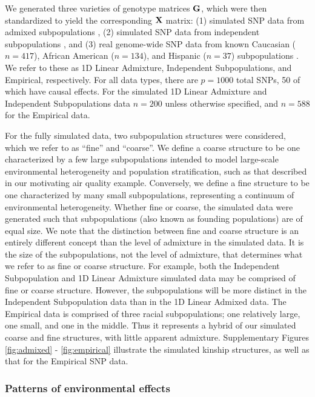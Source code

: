 We generated three varieties of genotype matrices $\mathbf{G}$, which were then standardized to yield the corresponding $\mathbf{X}$ matrix: (1) simulated SNP data from admixed subpopulations \citep{Ochoa2016}, (2) simulated SNP data from independent subpopulations \citep{Ochoa2016}, and (3)  real genome-wide SNP data from known Caucasian ($n = 417$), African American ($n = 134$), and Hispanic ($n = 37$) subpopulations \citep{larkin2015objectives}. We refer to these as 1D Linear Admixture, Independent Subpopulations, and Empirical, respectively. For all data types, there are $p = 1000$ total SNPs, 50 of which have causal effects. For the simulated 1D Linear Admixture and Independent Subpopulations data $n = 200$ unless otherwise specified, and $n = 588$ for the Empirical data. 

For the fully simulated data, two subpopulation structures were considered, which we refer to as ``fine'' and ``coarse''.  We define a coarse structure to be one characterized by a few large subpopulations intended to model large-scale environmental heterogeneity and population stratification, such as that described in our motivating air quality example. Conversely, we define a fine structure to be one characterized by many small subpopulations, representing a continuum of environmental heterogeneity. Whether fine or coarse, the simulated data were generated such that subpopulations (also known as founding populations) are of equal size. We note that the distinction between fine and coarse structure is an entirely different concept than the level of admixture in the simulated data. It is the size of the subpopulations, not the level of admixture, that determines what we refer to as fine or coarse structure. For example, both the Independent Subpopulation and 1D Linear Admixture simulated data may be comprised of fine or coarse structure. However, the subpopulations will be more distinct in the Independent Subpopulation data than in the 1D Linear Admixed data. The Empirical data is comprised of three racial subpopulations; one relatively large, one small, and one in the middle. Thus it represents a hybrid of our simulated coarse and fine structures, with little apparent admixture. Supplementary Figures \ref{fig:admixed} - \ref{fig:empirical} illustrate the simulated kinship structures, as well as that for the Empirical SNP data. 

\subsubsection{Patterns of environmental effects}

